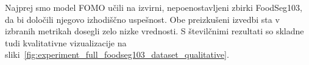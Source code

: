\documentclass[a4paper,twoside,openright,12pt,slovene]{book}
\begin{document}


            Najprej smo model FOMO učili na izvirni, nepoenostavljeni zbirki
            FoodSeg103, da bi določili njegovo izhodiščno uspešnost.
            Obe preizkušeni izvedbi sta v izbranih metrikah dosegli zelo nizke
            vrednosti. S številčnimi rezultati so skladne tudi kvalitativne
            vizualizacije na
            sliki~\ref{fig:experiment_full_foodseg103_dataset_qualitative}.
\end{document}
